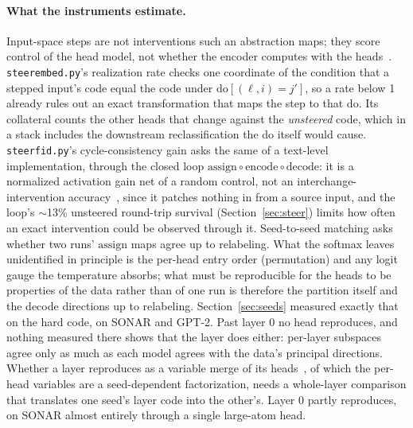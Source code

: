 \paragraph{What the instruments estimate.}
Input-space steps are not interventions such an abstraction maps; they
score control of the head model, not whether the encoder computes with
the heads~\cite[Sec.~3.7]{geiger2025}. \texttt{steerembed.py}'s
realization rate checks one coordinate of the condition that a stepped
input's code equal the code under $\mathrm{do}[(\ell,i){=}j']$, so a rate
below 1 already rules out an exact transformation that maps the step to
that do. Its collateral counts the other heads that change against the
\emph{unsteered} code, which in a stack includes the downstream
reclassification the do itself would cause. \texttt{steerfid.py}'s
cycle-consistency gain asks the same of a text-level implementation,
through the closed loop $\mathrm{assign} \circ \mathrm{encode} \circ
\mathrm{decode}$: it is a normalized activation gain net of a random
control, not an interchange-intervention accuracy~\cite{geiger2022},
since it patches nothing in from a source input, and the loop's
$\sim$13\% unsteered round-trip survival (Section~\ref{sec:steer}) limits
how often an exact intervention could be observed through it.
Seed-to-seed matching asks whether two runs' $\mathrm{assign}$ maps agree
up to relabeling. What the softmax leaves unidentified in principle is the
per-head entry order (permutation) and any logit gauge the temperature
absorbs; what must be reproducible for the heads to be properties of the
data rather than of one run is therefore the partition itself and the
decode directions up to relabeling. Section~\ref{sec:seeds} measured
exactly that on the hard code, on SONAR and GPT-2. Past layer 0 no head
reproduces, and nothing measured there shows that the layer does either:
per-layer subspaces agree only as much as each model agrees with the
data's principal directions. Whether a layer reproduces as a variable
merge of its heads~\cite[Def.~37]{geiger2025}, of which the per-head
variables are a seed-dependent factorization, needs a whole-layer
comparison that translates one seed's layer code into the other's. Layer
0 partly reproduces, on SONAR almost entirely through a single large-atom
head.

